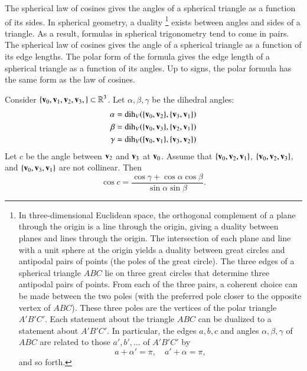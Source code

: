 The spherical law of cosines gives the angles of a spherical triangle
as a function of its sides.  In spherical geometry, a
duality%
\footnote{In three-dimensional Euclidean space, the orthogonal
  complement of a plane through the origin is a line through the
  origin, giving a duality between planes and lines through the
  origin.  The intersection of each plane and line with a unit sphere
  at the origin yields a duality between great circles and antipodal
  pairs of points (the poles of the great circle).  The three edges of
  a spherical triangle $ABC$ lie on three great circles that
  determine three antipodal pairs of points.  From each of the three
  pairs, a coherent choice can be made between the two poles (with the preferred pole closer to the opposite vertex of $ABC$).  These
  three poles are the vertices of the polar triangle $A'B'C'$.  Each
  statement about the triangle $ABC$ can be dualized to a statement
  about $A'B'C'$.  In particular, the edges $a,b,c$ and angles
  $\alpha,\beta,\gamma$ of $ABC$ are related to those $a',b',\ldots$
  of $A'B'C'$ by
\[ 
a + \alpha' = \pi,\quad a' + \alpha= \pi,
\] 
and so forth.  } %
%
exists between angles and sides of a triangle.  As a result, formulas
in spherical trigonometry tend to come in pairs.  The spherical law of
cosines gives the angle of a spherical triangle as a function of its
edge lengths.  The polar form of the formula gives the edge length of
a spherical triangle as a function of its angles.  Up to signs, the
polar formula has the same form as the law of cosines.
%

\begin{lemma}
\label{lemma:sloc2}  Consider 
  $\{{\mathbf v}_0,{\mathbf v}_1,{\mathbf v}_2,{\mathbf v}_3,\}\subset\mathbb{R}^3$.  Let
  $\alpha,\beta,\gamma$ be the dihedral angles:
\begin{align*}
\alpha &= \operatorname{dih}_V(\{{\mathbf v}_0,{\mathbf v}_2\},\{{\mathbf v}_3,{\mathbf v}_1\})\\
\beta &= \operatorname{dih}_V(\{{\mathbf v}_0,{\mathbf v}_3\},\{{\mathbf v}_2,{\mathbf v}_1\})\\
\gamma&= \operatorname{dih}_V(\{{\mathbf v}_0,{\mathbf v}_1\},\{{\mathbf v}_3,{\mathbf v}_2\})\\
\end{align*}
Let $c$ be the
angle between ${\mathbf v}_2$ and ${\mathbf v}_3$ at ${\mathbf v}_0$. 
Assume that $\{{\mathbf v}_0,{\mathbf v}_2,{\mathbf v}_1\}$, $\{{\mathbf v}_0,{\mathbf v}_2,{\mathbf v}_3\}$, and $\{{\mathbf v}_0,{\mathbf v}_3,{\mathbf v}_1\}$ are not collinear.
Then
\[ 
\cos c = \frac{\cos \gamma + \cos \alpha \cos \beta}
{\sin \alpha\sin \beta}.
\] 
\end{lemma}
%
%

